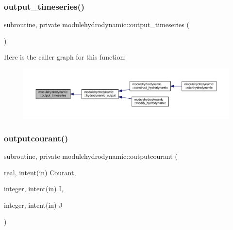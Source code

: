 \subsubsection{\texorpdfstring{output\+\_\+timeseries()}{output\_timeseries()}}
{\footnotesize\ttfamily subroutine, private modulehydrodynamic\+::output\+\_\+timeseries (\begin{DoxyParamCaption}{ }\end{DoxyParamCaption})\hspace{0.3cm}{\ttfamily [private]}}

Here is the caller graph for this function\+:\nopagebreak
\begin{figure}[H]
\begin{center}
\leavevmode
\includegraphics[width=350pt]{namespacemodulehydrodynamic_ab09a29c4bbdb3a0c03a3e8630b2d0829_icgraph}
\end{center}
\end{figure}
\mbox{\label{namespacemodulehydrodynamic_afd382f82c852a1679b370aaa578e6ce2}} 
\subsubsection{\texorpdfstring{outputcourant()}{outputcourant()}}
{\footnotesize\ttfamily subroutine, private modulehydrodynamic\+::outputcourant (\begin{DoxyParamCaption}\item[{real, intent(in)}]{Courant,  }\item[{integer, intent(in)}]{I,  }\item[{integer, intent(in)}]{J }\end{DoxyParamCaption})\hspace{0.3cm}{\ttfamily [private]}}

